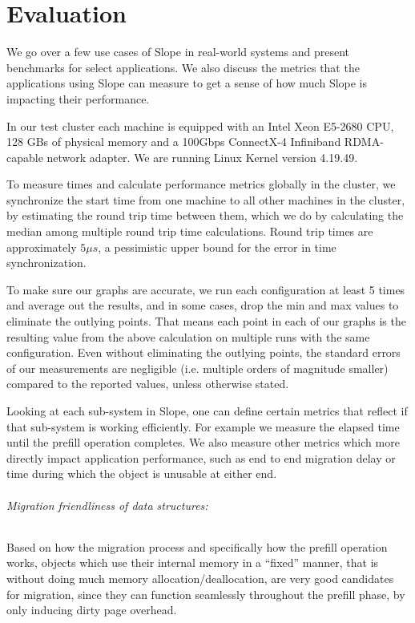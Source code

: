 \chapter{Evaluation}
\label{chap:evaluation}

We go over a few use cases of Slope in real-world systems and present
benchmarks for select applications. We also discuss
the metrics that the applications using Slope can measure to get a sense of
how much Slope is impacting their performance.

In our test cluster each machine is equipped with an Intel Xeon E5-2680 CPU,
128 GBs of physical memory and a 100Gbps ConnectX-4 Infiniband RDMA-capable
network adapter. We are running Linux Kernel version 4.19.49.

To measure times and calculate performance metrics globally in the cluster,
we synchronize the start time from one machine to all other machines in the
cluster, by estimating the round trip time between them, which we do by
calculating the median among multiple round trip time calculations. Round
trip times are approximately $5 {\mu}{s}$, a pessimistic upper bound for the
error in time synchronization.

To make sure our graphs are accurate, we run each configuration at least 5 times
and average out the results, and in some cases, drop the min and max values to
eliminate the outlying points. That means each point in each of our graphs is
the resulting value from the above calculation on multiple runs with the same
configuration. Even without eliminating the outlying points, the standard errors
of our measurements are negligible (i.e. multiple orders of magnitude smaller)
compared to the reported values, unless otherwise stated.


Looking at each sub-system in Slope, one can define certain metrics that
reflect if that sub-system is working efficiently. For example we measure
the elapsed time until the prefill operation completes. We also measure
other metrics which more directly impact application performance, such as
end to end migration delay or time during which the object is unusable at
either end.

\subparagraph{Migration friendliness of data structures:}
Based on how the migration process and specifically how the prefill operation
works, objects which use their internal memory in a ``fixed'' manner, that is
without doing much memory allocation/deallocation, are very good candidates
for migration, since they can function seamlessly throughout the prefill phase,
by only inducing dirty page overhead.

